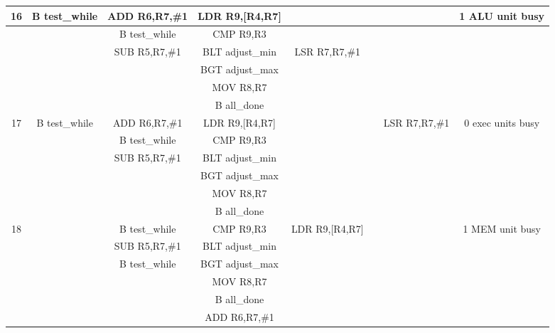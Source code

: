 \documentclass{article}
\begin{document}
{\begin{landscape}
\begin{longtable}{|c|c|c|c|c:c|c|c|}
    16 & B test\_while & ADD R6,R7,\#1 & LDR R9,[R4,R7] & & & & 1 ALU unit busy \\ \hline
     & & B test\_while & CMP R9,R3 & & & & \\ \hline
     & & SUB R5,R7,\#1 & BLT adjust\_min & LSR R7,R7,\#1 &  & & \\ \hline
     &  &  & BGT adjust\_max & &  & & \\ \hline
     &  &  & MOV R8,R7 &  &  &  & \\ \hline
     &  &  & B all\_done &  &  &  & \\ \hline \hline
     
    17 & B test\_while & ADD R6,R7,\#1 & LDR R9,[R4,R7] & & & LSR R7,R7,\#1 & 0 exec units busy \\ \hline
     & & B test\_while & CMP R9,R3 & & & & \\ \hline
     & & SUB R5,R7,\#1 & BLT adjust\_min & &  & & \\ \hline
     &  &  & BGT adjust\_max & &  & & \\ \hline
     &  &  & MOV R8,R7 &  &  &  & \\ \hline
     &  &  & B all\_done &  &  &  & \\ \hline \hline
     
    18 & & B test\_while & CMP R9,R3 & LDR R9,[R4,R7] & & & 1 MEM unit busy \\ \hline
     & & SUB R5,R7,\#1 & BLT adjust\_min & & & & \\ \hline
     & & B test\_while & BGT adjust\_max & &  & & \\ \hline
     &  &  & MOV R8,R7 & &  & & \\ \hline
     &  &  & B all\_done &  &  &  & \\ \hline
     &  &  & ADD R6,R7,\#1 &  &  &  & \\ \hline \hline
     

\end{longtable}
\end{landscape}}
\end{document}
